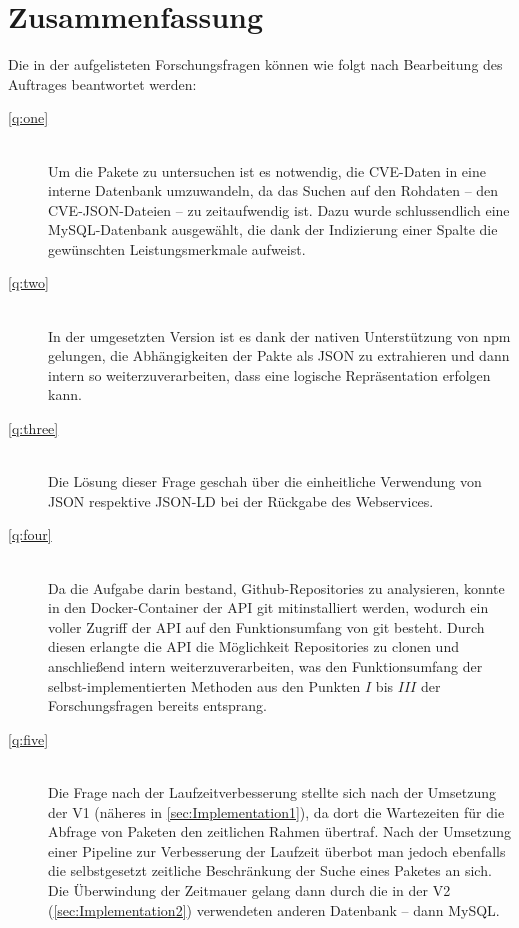 \section{Zusammenfassung} \label{sec:Zusammenfassung}
    Die in der  aufgelisteten Forschungsfragen können wie folgt nach Bearbeitung des Auftrages beantwortet werden:
    \begin{description}
        \item[\ref{q:one}]\hfill \\
            Um die Pakete zu untersuchen ist es notwendig, die \ac{CVE}-Daten in eine interne Datenbank umzuwandeln, da das Suchen auf den Rohdaten -- den \ac{CVE}-\ac{JSON}-Dateien -- zu zeitaufwendig ist.
            Dazu wurde schlussendlich eine MySQL-Datenbank ausgewählt, die dank der Indizierung einer Spalte die gewünschten Leistungsmerkmale aufweist.
        \item[\ref{q:two}]\hfill \\
            In der umgesetzten Version ist es dank der nativen Unterstützung von npm gelungen, die Abhängigkeiten der Pakte als \ac{JSON} zu extrahieren und dann intern so weiterzuverarbeiten, dass eine logische Repräsentation erfolgen kann.
        \item[\ref{q:three}]\hfill \\
            Die Lösung dieser Frage geschah über die einheitliche Verwendung von \ac{JSON} respektive \linebreak[4] \ac{JSON-LD} bei der Rückgabe des Webservices.
        \item[\ref{q:four}]\hfill \\
            Da die Aufgabe darin bestand, Github-Repositories zu analysieren, konnte in den Docker-Container der \ac{API} git mitinstalliert werden, wodurch ein voller Zugriff der \ac{API} auf den Funktionsumfang von git besteht.
            Durch diesen erlangte die \ac{API} die Möglichkeit Repositories zu clonen und anschließend intern weiterzuverarbeiten, was den Funktionsumfang der selbst-implementierten Methoden aus den Punkten $I$ bis $III$ der Forschungsfragen bereits entsprang.
        \item[\ref{q:five}]\hfill \\
            Die Frage nach der Laufzeitverbesserung stellte sich nach der Umsetzung der V1 (näheres in \ref{sec:Implementation1}), da dort die Wartezeiten für die Abfrage von Paketen den zeitlichen Rahmen übertraf.
            Nach der Umsetzung einer Pipeline zur Verbesserung der Laufzeit überbot man jedoch ebenfalls die selbstgesetzt zeitliche Beschränkung der Suche eines Paketes an sich.
            \\
            Die Überwindung der Zeitmauer gelang dann durch die in der V2 (\ref{sec:Implementation2}) verwendeten anderen Datenbank -- dann MySQL.
    \end{description}
